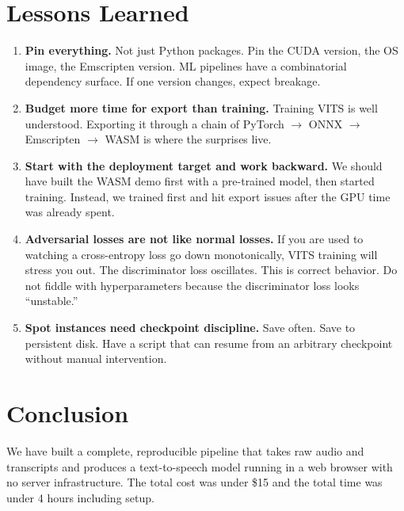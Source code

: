 \documentclass[10pt,a4paper,twocolumn]{article}
\begin{document}
\section{Lessons Learned}
\label{sec:lessons}

\begin{enumerate}
    \item \textbf{Pin everything.} Not just Python packages. Pin the CUDA version, the OS image, the Emscripten version. ML pipelines have a combinatorial dependency surface. If one version changes, expect breakage.

    \item \textbf{Budget more time for export than training.} Training VITS is well understood. Exporting it through a chain of PyTorch $\to$ ONNX $\to$ Emscripten $\to$ WASM is where the surprises live.

    \item \textbf{Start with the deployment target and work backward.} We should have built the WASM demo first with a pre-trained model, then started training. Instead, we trained first and hit export issues after the GPU time was already spent.

    \item \textbf{Adversarial losses are not like normal losses.} If you are used to watching a cross-entropy loss go down monotonically, VITS training will stress you out. The discriminator loss oscillates. This is correct behavior. Do not fiddle with hyperparameters because the discriminator loss looks ``unstable.''

    \item \textbf{Spot instances need checkpoint discipline.} Save often. Save to persistent disk. Have a script that can resume from an arbitrary checkpoint without manual intervention.
\end{enumerate}

\section{Conclusion}
\label{sec:conclusion}

We have built a complete, reproducible pipeline that takes raw audio and transcripts and produces a text-to-speech model running in a web browser with no server infrastructure. The total cost was under \$15 and the total time was under 4 hours including setup.
\end{document}
